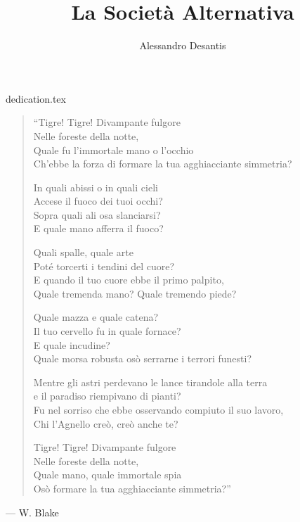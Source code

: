 \documentclass[a4paper,oneside,11pt]{memoir}
\title{La Società Alternativa}
\author{Alessandro Desantis}
\date{}
\begin{document}
    \begin{titlingpage}
        \maketitle
    \end{titlingpage}

    {dedication.tex}
    \begin{dedicationpage}
        \begin{verse}
            \itshape{
            ``Tigre! Tigre! Divampante fulgore\\
            Nelle foreste della notte,\\
            Quale fu l'immortale mano o l'occhio\\
            Ch'ebbe la forza di formare la tua agghiacciante simmetria?

            In quali abissi o in quali cieli\\
            Accese il fuoco dei tuoi occhi?\\
            Sopra quali ali osa slanciarsi?\\
            E quale mano afferra il fuoco?

            Quali spalle, quale arte\\
            Poté torcerti i tendini del cuore?\\
            E quando il tuo cuore ebbe il primo palpito,\\
            Quale tremenda mano? Quale tremendo piede?

            Quale mazza e quale catena?\\
            Il tuo cervello fu in quale fornace?\\
            E quale incudine?\\
            Quale morsa robusta osò serrarne i terrori funesti?

            Mentre gli astri perdevano le lance tirandole alla terra\\
            e il paradiso riempivano di pianti?\\
            Fu nel sorriso che ebbe osservando compiuto il suo lavoro,\\
            Chi l'Agnello creò, creò anche te?

            Tigre! Tigre! Divampante fulgore\\
            Nelle foreste della notte,\\
            Quale mano, quale immortale spia\\
            Osò formare la tua agghiacciante simmetria?''
            \/}
        \end{verse}

        \begin{flushright}
            --- W. Blake
        \end{flushright}
    \end{dedicationpage}
\end{document}
